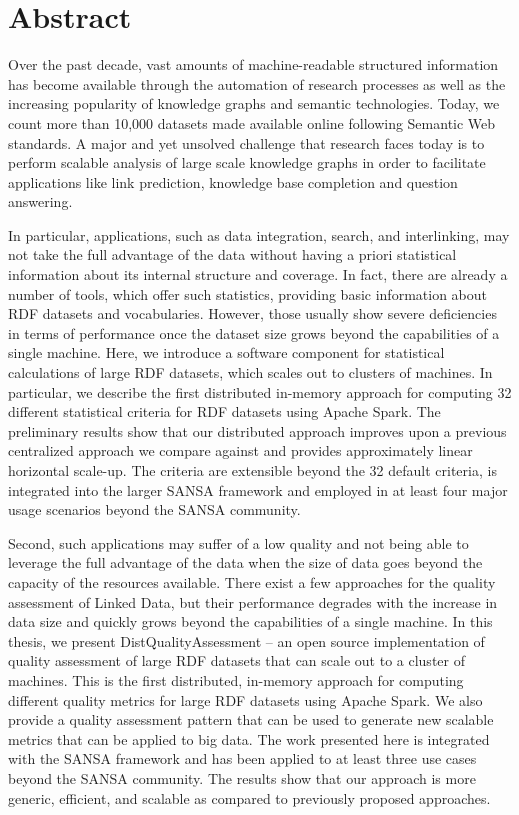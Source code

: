 \chapter*{Abstract}

Over the past decade, vast amounts of machine-readable structured information has become available through the automation of research processes as well as the increasing popularity of knowledge graphs and semantic technologies. 
Today, we count more than 10,000 datasets made available online following Semantic Web standards.
A major and yet unsolved challenge that research faces today is to perform scalable analysis of large scale knowledge graphs in order to facilitate applications like link prediction, knowledge base completion and question answering.

In particular, applications, such as data integration, search, and interlinking, may not take the full advantage of the data without having a priori statistical information about its internal structure and coverage.
In fact, there are already a number of tools, which offer such statistics, providing basic information about RDF datasets and vocabularies.
However, those usually show severe deficiencies in terms of performance once the dataset size grows beyond the capabilities of a single machine.
Here, we introduce a software component for statistical calculations of large RDF datasets, which scales out to clusters of machines.
In particular, we describe the first distributed in-memory approach for computing 32 different statistical criteria for RDF datasets using Apache Spark.
The preliminary results show that our distributed approach improves upon a previous centralized approach we compare against and provides approximately linear horizontal scale-up. 
The criteria are extensible beyond the 32 default criteria, is integrated into the larger SANSA framework and employed in at least four major usage scenarios beyond the SANSA community.

Second, such applications may suffer of a low quality and not being able to leverage the full advantage of the data when the size of data goes beyond the capacity of the resources available.
There exist a few approaches for the quality assessment of Linked Data, but their performance degrades with the increase in data size and quickly grows beyond the capabilities of a single machine.
In this thesis, we present DistQualityAssessment -- an open source 
implementation of quality assessment of large RDF datasets that can scale out to a cluster of machines.
This is the first distributed, in-memory approach for computing different quality metrics for large RDF datasets using Apache Spark. We also provide a quality assessment pattern that can be used to generate new scalable metrics that can be applied to big data.
The work presented here is integrated with the SANSA framework and has been applied to at least three use cases beyond the SANSA community.   
The results show that our approach is more generic, efficient, and scalable as compared to previously proposed approaches.

